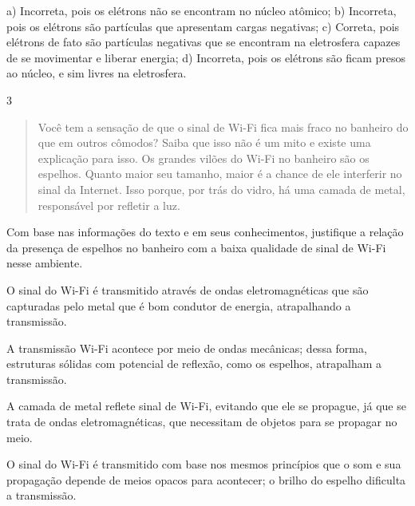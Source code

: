 {{a) Incorreta, pois os elétrons não se encontram no núcleo atômico;
b) Incorreta, pois os elétrons são partículas que apresentam cargas
  negativas;
c) Correta, pois elétrons de fato são partículas negativas que se
  encontram na eletrosfera capazes de se movimentar e liberar energia;
d) Incorreta, pois os elétrons são ficam presos ao núcleo, e sim livres
  na eletrosfera.}

\num{3}

\begin{quote}  
Você tem a sensação de que o sinal de Wi-Fi fica mais fraco no
banheiro do que em outros cômodos? Saiba que isso não é um mito e
existe uma explicação para isso. Os grandes vilões do Wi-Fi no
banheiro são os espelhos. Quanto maior seu tamanho, maior é a chance
de ele interferir no sinal da Internet. Isso porque, por trás do
vidro, há uma camada de metal, responsável por refletir a luz.

\end{quote}

Com base nas informações do texto e em seus conhecimentos, justifique a
relação da presença de espelhos no banheiro com a baixa qualidade de
sinal de Wi-Fi nesse ambiente.

\begin{escolha}
\item
  O sinal do Wi-Fi é transmitido através de ondas eletromagnéticas que
  são capturadas pelo metal que é bom condutor de energia, atrapalhando
  a transmissão.
\item
  A transmissão Wi-Fi acontece por meio de ondas mecânicas; dessa forma,
  estruturas sólidas com potencial de reflexão, como os espelhos,
  atrapalham a transmissão.
\item
  A camada de metal reflete sinal de Wi-Fi, evitando que ele se
  propague, já que se trata de ondas eletromagnéticas, que necessitam de
  objetos para se propagar no meio.
\item
  O sinal do Wi-Fi é transmitido com base nos mesmos princípios que o som
  e sua propagação depende de meios opacos para acontecer; o brilho do
  espelho dificulta a transmissão.
\end{escolha}

}
